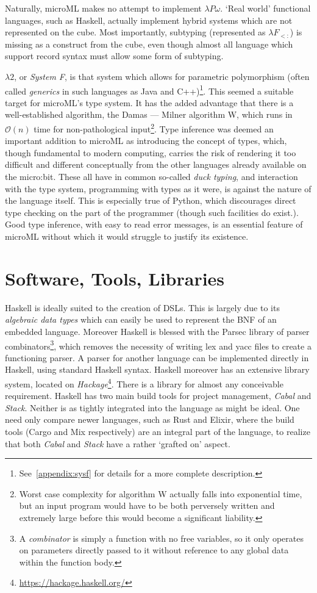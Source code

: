 \documentclass[12pt, a4paper]{report}
\begin{document}
Naturally, microML makes no attempt to implement $\lambda P\omega$. `Real world' functional
languages, such as Haskell, actually implement hybrid systems which are not represented on the cube.
Most importantly, subtyping (represented as $\lambda F_{<:}$) is missing as a construct from the cube, 
even though almost all language which support record syntax must allow some form of subtyping.

$\lambda 2$, or \textit{System F}, is that system which allows for \gls{parametric polymorphism} (often
called \textit{generics} in such languages as Java and C++)\footnote{See~\ref{appendix:sysf} for
details for a more complete description.}. This seemed a suitable target for microML's type system.
It has the added advantage that there is a well-established algorithm, the Damas --- Milner algorithm
W, which runs in $\mathcal{O}(n)$ time for non-pathological input\footnote{Worst case complexity
for algorithm W actually falls into exponential time, but an input program would have to be both
perversely written and extremely large before this would become a significant liability.}. Type
inference was deemed an important addition to microML as introducing the concept of types, which,
though fundamental to modern computing, carries the risk of rendering it too difficult and different
conceptually from the other languages already available on the micro:bit. These all have in common
so-called \textit{\gls{duck typing}}, and interaction with the type system, programming with types as
it were, is against the nature of the language itself. This is especially true of Python, which
discourages direct type checking on the part of the programmer (though such facilities do exist.).
Good type inference, with easy to read error messages, is an essential feature of microML without
which it would struggle to justify its existence.

\section{Software, Tools, Libraries}
Haskell is ideally suited to the creation of \gls{DSL}s. This is largely due to its
\textit{algebraic data types} which can easily be used to represent the BNF of an embedded
language. Moreover Haskell is blessed with the Parsec library of parser combinators\footnote{A
\textit{combinator} is simply a function with no free variables, so it only operates on
parameters directly passed to it without reference to any global data within the function
body.}, which removes the necessity of writing lex and yacc files to create a functioning
parser. A parser for another language can be implemented directly in Haskell, using
standard Haskell syntax. Haskell moreover has an extensive library system, located on
\textit{Hackage}\footnote{\url{https://hackage.haskell.org/}}. There is a library for almost any
conceivable requirement. Haskell has two main build tools for project management, \textit{Cabal} and
\textit{Stack}. Neither is as tightly integrated into the language as might be ideal. One need only
compare newer languages, such as Rust and Elixir, where the build tools (Cargo and Mix respectively)
are an integral part of the language, to realize that both \textit{Cabal} and \textit{Stack} have a
rather `grafted on' aspect.
\end{document}
